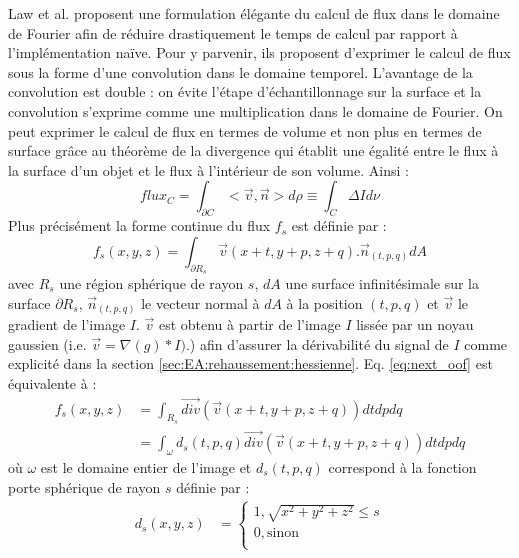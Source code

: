    Law et al. \cite{Law2009_efficient_implementation} proposent une formulation élégante du calcul de flux dans le domaine de Fourier afin de réduire drastiquement le temps de calcul par rapport à l'implémentation naïve.
  Pour y parvenir, ils proposent d'exprimer le calcul de flux sous la forme d'une convolution dans le domaine temporel. L'avantage de la convolution est double : on évite l'étape d'échantillonnage sur la surface et la convolution s'exprime comme une multiplication dans le domaine de Fourier. On peut exprimer le calcul de flux en termes de volume et non plus en termes de surface grâce au théorème de la divergence qui établit une égalité entre le flux à la surface d'un objet et le flux à l'intérieur de son volume. Ainsi :
  \begin{equation}
    flux_{C} = \int_{\partial C}< \vec{v},\vec{n} > d\rho \equiv \int_{C }\Delta I d\nu
  \end{equation}
  Plus précisément la forme continue du flux $f_s$ est définie par :
  \begin{equation}
    f_s(x,y,z) = \int_{\partial R_s}\vec{v}(x+t,y+p, z+q) . \vec{n}_{(t,p,q)}dA
    \label{eq:next_oof}
  \end{equation}
  avec $R_s$ une région sphérique de rayon $s$, $dA$ une surface infinitésimale sur la surface $\partial R_s$, $\vec{n}_{(t,p,q)}$ le vecteur normal à $dA$ à la position $(t,p,q)$ et $\vec{v}$ le gradient de l'image $I$. $\vec{v}$ est obtenu à partir de l'image $I$ lissée par un noyau gaussien (i.e. $\vec{v}=\nabla(g)*I)$.) afin d'assurer la dérivabilité du signal de $I$ comme explicité dans la section \ref{sec:EA:rehaussement:hessienne}.
  Eq. \ref{eq:next_oof} est équivalente à :
  \begin{align}
    f_s(x,y,z) & = \int_{R_s} \vec{div}( \vec{v}(x+t,y+p, z+q) ) dtdpdq \\
    \nonumber
    & = \int_{\omega} d_s(t,p,q) \vec{div}( \vec{v}(x+t,y+p, z+q) ) dtdpdq
  \end{align}
  où $\omega$ est le domaine entier de l'image et $d_s(t,p,q)$ correspond à la fonction porte sphérique de rayon $s$ définie par :
  \begin{align}
    d_s(x,y,z) & = \begin{cases} 
                  1, \sqrt{x^2 + y^2 + z^2} \leq s  \\
                  0, \text{sinon} \\
                \end{cases}
  \end{align}
